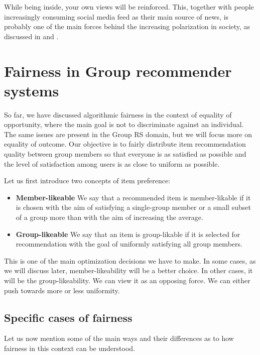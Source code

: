 While being inside, your own views will be reinforced. This, together with people increasingly consuming social media feed as their main source of news, is probably one of the main forces behind the increasing polarization in society, as discussed in \cite{echo_chambers_effect_2021} and \cite{echo_chambers_effect_twitter_2015}.


\section{Fairness in Group recommender systems} \label{sec:02_fairness_in_grs}

So far, we have discussed algorithmic fairness in the context of equality of opportunity, where the main goal is not to discriminate against an individual. The same issues are present in the Group RS domain, but we will focus more on equality of outcome.
Our objective is to fairly distribute item recommendation quality between group members so that everyone is as satisfied as possible and the level of satisfaction among users is as close to uniform as possible.


Let us first introduce two concepts of item preference:
\begin{itemize}
    \item \textbf{Member-likeable}\newline
    We say that a recommended item is member-likable if it is chosen with the aim of satisfying a single-group member or a small subset of a group more than with the aim of increasing the average.
    \item \textbf{Group-likeable}\newline
    We say that an item is group-likable if it is selected for recommendation with the goal of uniformly satisfying all group members.
\end{itemize}

This is one of the main optimization decisions we have to make. In some cases, as we will discuss later, member-likeability will be a better choice. In other cases, it will be the group-likeability. We can view it as an opposing force. We can either push towards more or less uniformity.


\subsection{Specific cases of fairness} \label{subsec:specific_cases_of_fairness}
Let us now mention some of the main ways and their differences as to how fairness in this context can be understood.



